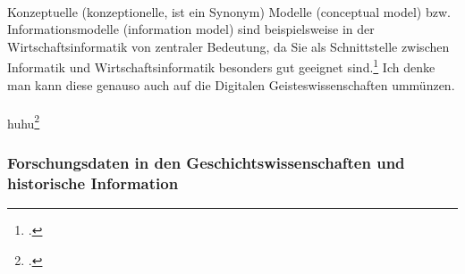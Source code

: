 \documentclass[12pt,a4paper]{article}
\begin{document}
\\
Konzeptuelle (konzeptionelle, ist ein Synonym) Modelle (conceptual model) bzw. Informationsmodelle (information model) sind beispielsweise in der Wirtschaftsinformatik von zentraler Bedeutung, da Sie als Schnittstelle zwischen Informatik und Wirtschaftsinformatik besonders gut geeignet sind.\footcite[][S.44-47]{kobler2010qualitat} Ich denke man kann diese genauso auch auf die Digitalen Geisteswissenschaften ummünzen.
\\
\\
huhu\footcite[Vgl][S.99-108]{jannidis2017digital} 

\subsubsection{Forschungsdaten in den Geschichtswissenschaften und historische Information}
\end{document}
